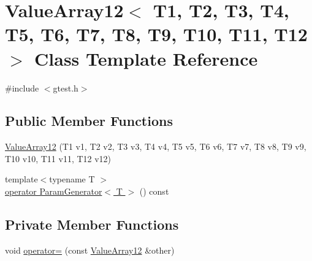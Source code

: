 \hypertarget{classtesting_1_1internal_1_1ValueArray12}{\section{\-Value\-Array12$<$ \-T1, \-T2, \-T3, \-T4, \-T5, \-T6, \-T7, \-T8, \-T9, \-T10, \-T11, \-T12 $>$ \-Class \-Template \-Reference}
\label{d9/d08/classtesting_1_1internal_1_1ValueArray12}
}


{\ttfamily \#include $<$gtest.\-h$>$}

\subsection*{\-Public \-Member \-Functions}
\begin{DoxyCompactItemize}
\item 
\hyperlink{classtesting_1_1internal_1_1ValueArray12_af59285570d5f242895e7d8402f12d806}{\-Value\-Array12} (\-T1 v1, \-T2 v2, \-T3 v3, \-T4 v4, \-T5 v5, \-T6 v6, \-T7 v7, \-T8 v8, \-T9 v9, \-T10 v10, \-T11 v11, \-T12 v12)
\item 
{\footnotesize template$<$typename T $>$ }\\\hyperlink{classtesting_1_1internal_1_1ValueArray12_a08ef46fa12c9dd8ef6fc630baeea89b7}{operator Param\-Generator$<$ T $>$} () const 
\end{DoxyCompactItemize}
\subsection*{\-Private \-Member \-Functions}
\begin{DoxyCompactItemize}
\item 
void \hyperlink{classtesting_1_1internal_1_1ValueArray12_af9da053e5970727572bb147f2405cc0c}{operator=} (const \hyperlink{classtesting_1_1internal_1_1ValueArray12}{\-Value\-Array12} \&other)
\end{DoxyCompactItemize}
